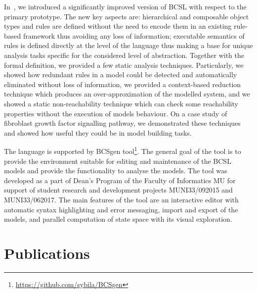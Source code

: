 \documentclass[11pt,a4paper]{report}
\begin{document}
In~\cite{trojak2018sasb}, we introduced a significantly improved version of BCSL with respect to the primary prototype. The new key aspects are: hierarchical and composable object types and rules are defined without the need to encode them in an existing rule-based framework thus avoiding any loss of information; executable semantics of rules is defined directly at the level of the language thus making a base for unique analysis tasks specific for the considered level of abstraction. Together with the formal definition, we provided a few static analysis techniques. Particularly, we showed how redundant rules in a model could be detected and automatically eliminated without loss of information, we provided a context-based reduction technique which produces an over-approximation of the modelled system, and we showed a static non-reachability technique which can check some reachability properties without the execution of models behaviour. On a case study of fibroblast growth factor signalling pathway, we demonstrated these techniques and showed how useful they could be in model building tasks.

The language is supported by BCSgen tool\footnote{\href{https://github.com/sybila/BCSgen}{https://github.com/sybila/BCSgen}}. The general goal of the tool is to provide the environment suitable for editing and maintenance of the BCSL models and provide the functionality to analyse the models. The tool was developed as a part of Dean's Program of the Faculty of Informatics MU for support of student research and development projects MUNI33/092015 and MUNI33/062017. The main features of the tool are an interactive editor with automatic syntax highlighting and error messaging, import and export of the models, and parallel computation of state space with its visual exploration.

\chapter{Publications}
\end{document}
